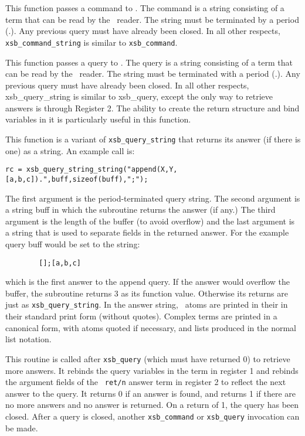 {\begin{description}
 
This function passes a command to \ourprolog .  The command is a
string consisting of a term that can be read by the \ourprolog\
reader.  The string must be terminated by a period (.).  Any previous
query must have already been closed.  In all other respects, {\tt
xsb\_command\_string} is similar to {\tt xsb\_command}.

 
This function passes a query to \ourprolog .  The query is a string
consisting of a term that can be read by the \ourprolog\ reader.  The
string must be terminated with a period (.).  Any previous query must
have already been closed.  In all other respects, xsb\_query\_string
is similar to xsb\_query, except the only way to retrieve answers is
through Register 2.  The ability to create the return structure and
bind variables in it is particularly useful in this function.

\index{{\tt xsb\_query\_string\_string}} This function is a variant of
{\tt xsb\_query\_string} that returns its answer (if there is one) as a
string.  An example call is:
\begin{verbatim}
rc = xsb_query_string_string("append(X,Y,[a,b,c]).",buff,sizeof(buff),";");
\end{verbatim}
The first argument is the period-terminated query string.  The second
argument is a string buff in which the subroutine returns the answer (if
any.)  The third argument is the length of the buffer (to avoid
overflow) and the last argument is a string that is used to separate
fields in the returned answer.  For the example query buff would be set
to the string:
\begin{verbatim}
        [];[a,b,c]
\end{verbatim}
which is the first answer to the append query.  If the answer would
overflow the buffer, the subroutine returns 3 as its function value.
Otherwise its returns are just as {\tt xsb\_query\_string}.
In the answer string, \ourprolog\ atoms are printed in their in their
standard print form (without quotes).  Complex terms are printed in a
canonical form, with atoms quoted if necessary, and lists produced in
the normal list notation.

 
This routine is called after {\tt xsb\_query} (which must have
returned 0) to retrieve more answers.  It rebinds the query variables
in the term in register 1 and rebinds the argument fields of the {\tt
ret/n} answer term in register 2 to reflect the next answer to the
query.  It returns 0 if an answer is found, and returns 1 if there are
no more answers and no answer is returned. On a return of 1, the query
has been closed.  After a query is closed, another {\tt xsb\_command}
or {\tt xsb\_query} invocation can be made.


\end{description}}
